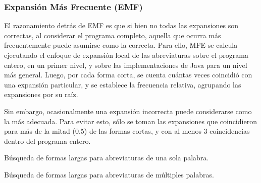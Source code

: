 {\subsubsection{Expansión Más Frecuente (EMF)}
El razonamiento detrás de EMF es que si bien no todas las expansiones son correctas, al considerar el programa completo, aquella que ocurra más frecuentemente puede asumirse como la correcta.
Para ello, MFE se calcula ejecutando el enfoque de expansión local de las abreviaturas sobre el programa entero, en un primer nivel, y sobre las implementaciones de Java para un nivel más general.
Luego, por cada forma corta, se cuenta cuántas veces coincidió con una expansión particular, y se establece la frecuencia relativa, agrupando las expansiones por su raíz.

Sin embargo, ocasionalmente una expansión incorrecta puede considerarse como la más adecuada.
Para evitar esto, sólo se toman las expansiones que coincidieron para más de la mitad (0.5) de las formas cortas, y con al menos 3 coincidencias dentro del programa entero.

\begin{algorithm}[H]
\caption{Búsqueda de formas largas para abreviaturas de una sola palabra.}
\label{algSingleWords}
\DontPrintSemicolon
  
  
  \BlankLine
\end{algorithm}

\begin{algorithm}
\caption{Búsqueda de formas largas para abreviaturas de múltiples palabras.}
\label{algMultiWords}
\DontPrintSemicolon
  

\end{algorithm}}

